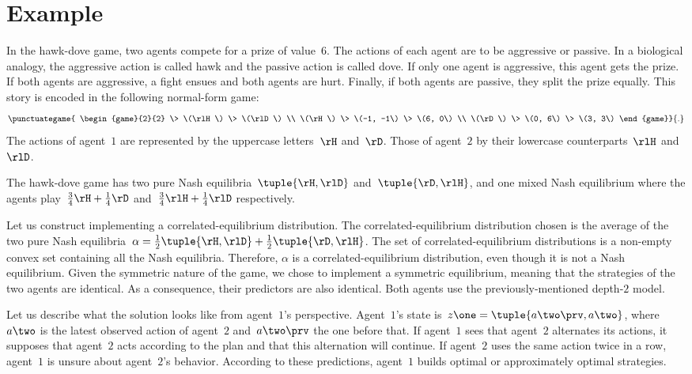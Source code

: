 \section{Example}
\label{sec:example}

In the hawk-dove game, two agents compete for a prize of value~\(6\).
The actions of each agent are to be aggressive or passive.
In a biological analogy, the aggressive action is called hawk and the passive action is called dove.
If only one agent is aggressive, this agent gets the prize.
If both agents are aggressive, a fight ensues and both agents are hurt.
Finally, if both agents are passive, they split the prize equally.
This story is encoded in the following normal-form game:
\vspace{-1em}
\[
\punctuategame{
\begin{game}{2}{2}
        \> \(\rlH\)   \> \(\rlD\)  \\
\(\rH\) \> \(-1, -1\) \> \(6, 0\) \\
\(\rD\) \> \(0, 6\)   \> \(3, 3\)
\end{game}}
{.}
\]
The actions of agent~\(1\) are represented by the uppercase letters~\(\rH\) and~\(\rD\).
Those of agent~\(2\) by their lowercase counterparts~\(\rlH\) and~\(\rlD\).

The hawk-dove game has two pure Nash equilibria~\(\tuple{\rH, \rlD}\) and~\(\tuple{\rD, \rlH}\), and one mixed Nash equilibrium where the agents play~\(\frac{3}{4} \rH + \frac{1}{4} \rD\) and~\(\frac{3}{4} \rlH + \frac{1}{4} \rlD\) respectively.

Let us construct  implementing a correlated-equilibrium distribution.
The correlated-equilibrium distribution chosen is the average of the two pure Nash equilibria~\(\alpha = \frac{1}{2} \tuple{\rH, \rlD} + \frac{1}{2} \tuple{\rD, \rlH}\).
The set of correlated-equilibrium distributions is a non-empty convex set containing all the Nash equilibria.
Therefore, \(\alpha\) is a correlated-equilibrium distribution, even though it is not a Nash equilibrium.
Given the symmetric nature of the game, we chose to implement a symmetric equilibrium, meaning that the strategies of the two agents are identical.
As a consequence, their predictors are also identical.
Both agents use the previously-mentioned depth-\(2\) model.

Let us describe what the solution looks like from agent~\(1\)'s perspective.
Agent~\(1\)'s state is~\(z\one = \tuple{a\two\prv, a\two}\), where~\(a\two\) is the latest observed action of agent~\(2\) and~\(a\two\prv\) the one before that.
If agent~\(1\) sees that agent~\(2\) alternates its actions, it supposes that agent~\(2\) acts according to the plan and that this alternation will continue.
If agent~\(2\) uses the same action twice in a row, agent~\(1\) is unsure about agent~\(2\)'s behavior.
According to these predictions, agent~\(1\) builds optimal or approximately optimal strategies.

